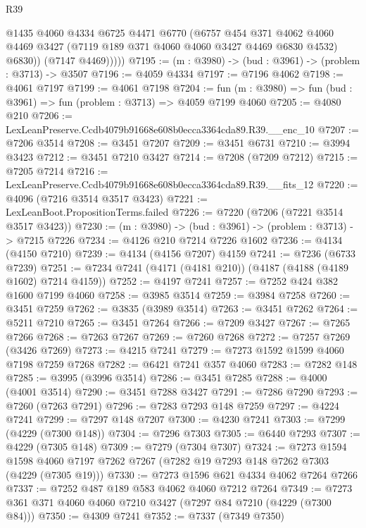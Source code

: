 \begin{lexlean}{R39}
\begin{coremodule}
              @1435
              @4060
              @4334
              @6725
              @4471
              @6770
              (@6757
                @454
                @371
                @4062
                @4060
                @4469
                @3427
                (@7119 @189 @371 @4060 @4060 @3427 @4469 @6830 @4532)
                @6830))
            (@7147 @4469)))))
@7195 := (m : @3980) -> (bud : @3961) -> (problem : @3713) -> @3507
@7196 := @4059 @4334
@7197 := @7196 @4062
@7198 := @4061 @7197
@7199 := @4061 @7198
@7204 := fun (m : @3980) => fun (bud : @3961) => fun (problem : @3713) => @4059 @7199 @4060
@7205 := @4080 @210
@7206 := LexLeanPreserve.Ccdb4079b91668e608b0ecca3364cda89.R39.__enc_10
@7207 := @7206 @3514
@7208 := @3451 @7207
@7209 := @3451 @6731
@7210 := @3994 @3423
@7212 := @3451 @7210 @3427
@7214 := @7208 (@7209 @7212)
@7215 := @7205 @7214
@7216 := LexLeanPreserve.Ccdb4079b91668e608b0ecca3364cda89.R39.__fits_12
@7220 := @4096 (@7216 @3514 @3517 @3423)
@7221 := LexLeanBoot.PropositionTerms.failed
@7226 := @7220 (@7206 (@7221 @3514 @3517 @3423))
@7230 := (m : @3980) -> (bud : @3961) -> (problem : @3713) -> @7215 @7226
@7234 := @4126 @210 @7214 @7226 @1602
@7236 := @4134 (@4150 @7210)
@7239 := @4134 (@4156 @7207) @4159
@7241 := @7236 (@6733 @7239)
@7251 := @7234 @7241 (@4171 (@4181 @210)) (@4187 (@4188 (@4189 @1602) @7214 @4159))
@7252 := @4197 @7241
@7257 := @7252 @424 @382 @1600 @7199 @4060
@7258 := @3985 @3514
@7259 := @3984 @7258
@7260 := @3451 @7259
@7262 := @3835 (@3989 @3514)
@7263 := @3451 @7262
@7264 := @5211 @7210
@7265 := @3451 @7264
@7266 := @7209 @3427
@7267 := @7265 @7266
@7268 := @7263 @7267
@7269 := @7260 @7268
@7272 := @7257 @7269 (@3426 @7269)
@7273 := @4215 @7241
@7279 := @7273 @1592 @1599 @4060 @7198 @7259 @7268
@7282 := @6421 @7241 @357 @4060
@7283 := @7282 @148
@7285 := @3995 (@3996 @3514)
@7286 := @3451 @7285
@7288 := @4000 (@4001 @3514)
@7290 := @3451 @7288 @3427
@7291 := @7286 @7290
@7293 := @7260 (@7263 @7291)
@7296 := @7283 @7293 @148 @7259
@7297 := @4224 @7241
@7299 := @7297 @148 @7207
@7300 := @4230 @7241
@7303 := @7299 (@4229 (@7300 @148))
@7304 := @7296 @7303
@7305 := @6440 @7293
@7307 := @4229 (@7305 @148)
@7309 := @7279 (@7304 @7307)
@7324 := @7273
    @1594
    @1598
    @4060
    @7197
    @7262
    @7267
    (@7282 @19 @7293 @148 @7262 @7303 (@4229 (@7305 @19)))
@7330 := @7273 @1596 @621 @4334 @4062 @7264 @7266
@7337 := @7252 @487 @189 @583 @4062 @4060 @7212 @7264
@7349 := @7273 @361 @371 @4060 @4060 @7210 @3427 (@7297 @84 @7210 (@4229 (@7300 @84)))
@7350 := @4309 @7241
@7352 := @7337 (@7349 @7350)

\end{coremodule}
\end{lexlean}
